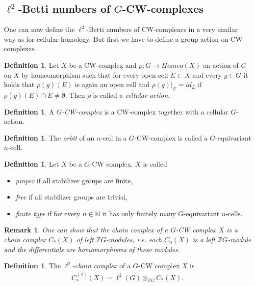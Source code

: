 \documentclass[12pt,a4paper]{scrartcl}
\theoremstyle{plain}
\newtheorem{Remark}[Theorem]{Remark}
\theoremstyle{definition}
\newtheorem{Definition}[Theorem]{Definition}
\numberwithin{equation}{section}
\newcommand{\Z}{\mathbb{Z}} %
\newcommand{\N}{\mathbb{N}} %
\newcommand{\2}{\mathbb{Z} / 2 \mathbb{Z}}
\newcommand{\1}{\bar{1}}
\newcommand{\0}{\bar{0}}
\begin{document}
\subsection{$\ell^2$-Betti numbers of $G$-CW-complexes}
One can now define the $\ell^2$-Betti numbers of CW-complexes in a very similar way as for cellular homology. But first we have to define a group action on CW-complexes.
\begin{Definition}
	Let $X$ be a CW-complex and $\rho: G \to Homeo(X)$ an action of $G$ on $X$ by homeomorphism such that for every open cell $E \subset X$ and every $g \in G$ it holds that $\rho(g)(E)$ is again an open cell and $\rho(g)|_{E} = id_E$ if $\rho(g)(E) \cap E \neq \emptyset$. Then $\rho$ is called a \emph{cellular action}.
\end{Definition}

\begin{Definition}
	A \emph{$G$-CW-complex} is a CW-complex together with a cellular $G$-action.
\end{Definition}

\begin{Definition}
	The \emph{orbit} of an $n$-cell in a $G$-CW-complex is called a $G$-equivariant $n$-cell.
\end{Definition}

\begin{Definition}
	Let $X$ be a $G$-CW complex. $X$ is called
	\begin{itemize}
		\item \emph{proper} if all stabilizer groups are finite,
		\item \emph{free} if all stabilizer groups are trivial,
		\item \emph{finite type} if for every $n \in \N$ it has only finitely many $G$-equivariant $n$-cells.
	\end{itemize}
\end{Definition}

\begin{Remark}
	One can show that the chain complex of a $G$-CW complex $X$ is a chain complex $C_*(X)$ of left $\Z G$-modules, i.e. each $C_n(X)$ is a left $\Z G$-module and the differentials are homomorphisms of these modules.
\end{Remark}
\begin{Definition}
	The \emph{$\ell^2$-chain complex} of a $G$-CW complex $X$ is
	\begin{align*}
		C_*^{(2)}(X) = \ell^2(G) \otimes_{\Z G} C_*(X).
	\end{align*}
\end{Definition}
\end{document}
